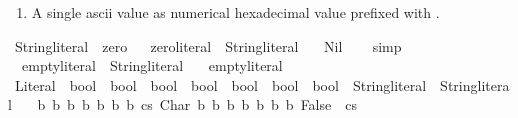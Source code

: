 \begin{isabellebody}
\begin{isamarkuptext}
\begin{enumerate}
\item A single ascii value as numerical hexadecimal value prefixed with .%
\end{enumerate}%
\end{isamarkuptext}\isamarkuptrue%
\isamarkupfalse%
\ String{\isachardot}{\kern0pt}literal\ {\isacharcolon}{\kern0pt}{\isacharcolon}{\kern0pt}\ zero\isanewline
{}\isanewline
\isanewline
{}\isamarkupfalse%
\isanewline
{}\isanewline
\isanewline
{}\ \isamarkupfalse%
\ zero{\isacharunderscore}{\kern0pt}literal\ {\isacharcolon}{\kern0pt}{\isacharcolon}{\kern0pt}\ String{\isachardot}{\kern0pt}literal\isanewline
\ \ \ Nil\isanewline
%
\isadelimproof
\ \ %
\endisadelimproof
%
\isatagproof
{}\isamarkupfalse%
\ simp%
\endisatagproof
{\isafoldproof}%
%
\isadelimproof
\isanewline
%
\endisadelimproof
\isanewline
{}\isamarkupfalse%
%
\isadelimproof
\ %
\endisadelimproof
%
\isatagproof
\isacommand{{\isachardot}{\kern0pt}{\isachardot}{\kern0pt}}\isamarkupfalse%
%
\endisatagproof
{\isafoldproof}%
%
\isadelimproof
%
\endisadelimproof
\isanewline
\isanewline
{}\isamarkupfalse%
\isanewline
\isanewline
{}\isamarkupfalse%
\isanewline
\isanewline
{}\isamarkupfalse%
\isanewline
{}\isanewline
\isanewline
{}\ \isamarkupfalse%
\ {\isacharparenleft}{\kern0pt}\ empty{\isacharunderscore}{\kern0pt}literal\ {\isacharcolon}{\kern0pt}{\isacharcolon}{\kern0pt}\ String{\isachardot}{\kern0pt}literal\isanewline
\ \ \ {\isachardoublequoteopen}empty{\isacharunderscore}{\kern0pt}literal\ {\isasymequiv}\ {}{\isachardoublequoteclose}\isanewline
\isanewline
{}\ \isamarkupfalse%
\ Literal\ {\isacharcolon}{\kern0pt}{\isacharcolon}{\kern0pt}\ {\isachardoublequoteopen}bool\ {\isasymRightarrow}\ bool\ {\isasymRightarrow}\ bool\ {\isasymRightarrow}\ bool\ {\isasymRightarrow}\ bool\ {\isasymRightarrow}\ bool\ {\isasymRightarrow}\ bool\ {\isasymRightarrow}\ String{\isachardot}{\kern0pt}literal\ {\isasymRightarrow}\ String{\isachardot}{\kern0pt}literal{\isachardoublequoteclose}\isanewline
\ \ \ {\isachardoublequoteopen}{\isasymlambda}b{}\ b{}\ b{}\ b{}\ b{}\ b{}\ b{}\ cs{\isachardot}{\kern0pt}\ Char\ b{}\ b{}\ b{}\ b{}\ b{}\ b{}\ b{}\ False\ {\isacharhash}{\kern0pt}\ cs{\isachardoublequoteclose}\isanewline

\end{isabellebody}
